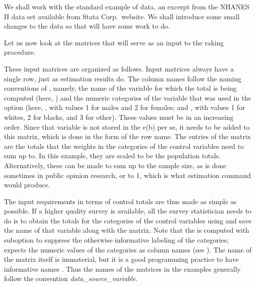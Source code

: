 \begin{stexample}[Example 1]

We shall work with the standard example of  data,
an excerpt from the NHANES II data set available from Stata Corp.\ website.
We shall introduce some small changes to the data so that
 will have some work to do.

\begin{stlog}
\nullskip
\end{stlog}

Let us now look at the matrices that will serve as an input to the
raking procedure.

\begin{stlog}
\nullskip
\end{stlog}

These input matrices are organized as follows. Input matrices always
have a single row, just as estimation results  do. The column
names follow the naming conventions of , namely,
the name of the variable for which the total is being computed
(here, ) and the numeric categories of the variable that
was used in the  option (here, , with values 1 for males
and 2 for females; and , with values 1 for whites, 2 for blacks,
and 3 for other). These values must be in an increasing order.
Since that variable is not stored in the e(b) per se,
it needs to be added to this matrix, which is done in the form of the row name.
The entries of the matrix are the totals that the weights in the categories
of the control variables need to sum up to. In this example, they are scaled
to be the population totals. Alternatively, these can be made to sum up to the
sample size, as is done sometimes in public opinion research, or to 1, which
is what  estimation command would produce.

The input requirements in terms of control totals are thus made as simple as possible.
If a higher quality survey is available, all the survey statistician needs to do
is to obtain the totals for the categories of the control variables
using 
and save the name of that variable along with the matrix.
Note that the 
is computed with  suboption to suppress
the otherwise informative labeling of the categories;
 expects the numeric values of the categories
as column names (see ).
The name of the matrix itself is immaterial, but it is
a good programming practice
to have informative names \citep{mcconnell:2004}. Thus the names
of the matrices in the examples generally follow the convention
{\it data{\_}source}{\_}{\it variable}.


\end{stexample}
